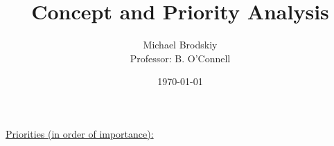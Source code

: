 


\title{Concept and Priority Analysis}
\date{\today}
\author{Michael Brodskiy\\ \small Professor: B. O'Connell}



\maketitle

\begin{center}
  \underline{Priorities (in order of importance):}
\end{center}

